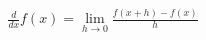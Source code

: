 \documentclass[preview]{standalone}
\begin{document}
\begin{align*}
\frac{d}{dx}f(x) = \lim_{h \to 0} \frac{f(x+h) - f(x)}{h}
\end{align*}
\end{document}
